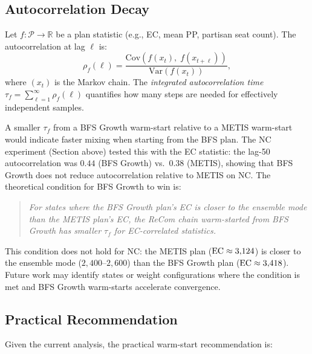 \subsection{Autocorrelation Decay}

Let $f: \mathcal{P} \to \mathbb{R}$ be a plan statistic (e.g., EC, mean PP,
partisan seat count).
The autocorrelation at lag $\ell$ is:
\[
  \rho_f(\ell) = \frac{\mathrm{Cov}(f(x_t),\; f(x_{t+\ell}))}
                      {\mathrm{Var}(f(x_t))},
\]
where $(x_t)$ is the Markov chain.
The \emph{integrated autocorrelation time} $\tau_f = \sum_{\ell=1}^\infty \rho_f(\ell)$
quantifies how many steps are needed for effectively independent samples.

A smaller $\tau_f$ from a BFS Growth warm-start relative to a METIS
warm-start would indicate faster mixing when starting from the BFS plan.
The NC experiment (Section above) tested this with the EC statistic:
the lag-50 autocorrelation was $0.44$ (BFS Growth) vs.\ $0.38$ (METIS),
showing that BFS Growth does not reduce autocorrelation relative to METIS
on NC.
The theoretical condition for BFS Growth to win is:

\begin{quote}
\textit{For states where the BFS Growth plan's EC is closer to the
ensemble mode than the METIS plan's EC, the ReCom chain warm-started
from BFS Growth has smaller $\tau_f$ for EC-correlated statistics.}
\end{quote}

This condition does not hold for NC: the METIS plan ($\mathrm{EC} \approx 3{,}124$)
is closer to the ensemble mode ($2{,}400$--$2{,}600$) than the BFS Growth
plan ($\mathrm{EC} \approx 3{,}418$).
Future work may identify states or weight configurations where the
condition is met and BFS Growth warm-starts accelerate convergence.

\subsection{Practical Recommendation}

Given the current analysis, the practical warm-start recommendation is:

